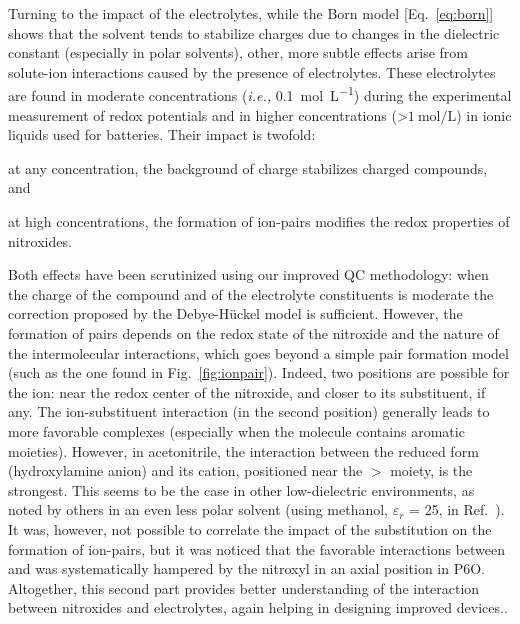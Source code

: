 \documentclass[review,preprint]{elsarticle}
\begin{document}
Turning to the impact of the electrolytes, while the Born model [Eq.~\eqref{eq:born}] shows that the solvent tends to stabilize charges due to changes in the dielectric constant (especially in polar solvents), other, more subtle effects arise from solute-ion interactions caused by the presence of electrolytes. These electrolytes are found in moderate concentrations (\textit{i.e.,} \SI{0.1}{\mole\per\liter}) during the experimental measurement of redox potentials and in higher concentrations (>$\SI{1}{\mole\per\liter}$) in ionic liquids used for batteries. 
Their  impact is twofold:
\begin{inparaenum}[(i)]
	\item at any concentration, the background of charge stabilizes charged compounds, and
	\item at high concentrations, the formation of ion-pairs modifies the redox properties of nitroxides.
\end{inparaenum}
Both effects have been scrutinized using our improved QC methodology: when the charge of the compound and of the electrolyte constituents is moderate  the correction proposed by the Debye-Hückel model is sufficient. However, the formation of pairs depends on the redox state of the nitroxide and the nature of the intermolecular interactions, which goes beyond a simple pair formation model (such as the one found in Fig.~\ref{fig:ionpair}). Indeed, two positions are possible for the ion: near the redox center of the nitroxide, and closer to its substituent, if any. The ion-substituent interaction (in the second position) generally leads to more favorable complexes (especially when the molecule contains aromatic moieties). However, in acetonitrile, the interaction between the reduced form (hydroxylamine anion) and its cation, positioned near the $>$ moiety, is the strongest. This seems to be the case in other low-dielectric environments, as noted by others in an even less polar solvent (using methanol, $\varepsilon_r$ = 25, in Ref.~).
It was, however, not possible to correlate the impact of the substitution on the formation of ion-pairs, but it was noticed that the favorable interactions between  and  was systematically hampered by the nitroxyl in an axial position in P6O. Altogether, this second part provides better understanding of the interaction between nitroxides and electrolytes, again helping in designing improved devices..
\end{document}
